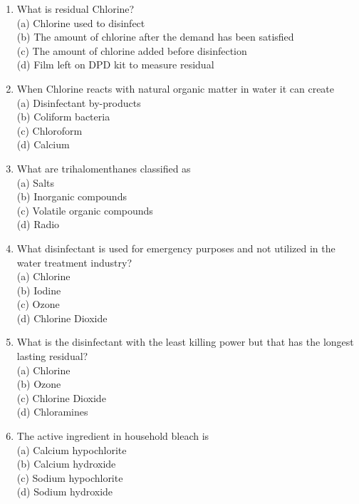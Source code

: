 \documentclass[10pt]{article}
\begin{document}
\begin{enumerate}
\begin{enumerate}
\begin{enumerate}
  \item What is residual Chlorine?\\
(a) Chlorine used to disinfect\\
(b) The amount of chlorine after the demand has been satisfied\\
(c) The amount of chlorine added before disinfection\\
(d) Film left on DPD kit to measure residual\\

  \item When Chlorine reacts with natural organic matter in water it can create\\
(a) Disinfectant by-products\\
(b) Coliform bacteria\\
(c) Chloroform\\
(d) Calcium\\

  \item What are trihalomenthanes classified as\\
(a) Salts\\
(b) Inorganic compounds\\
(c) Volatile organic compounds\\
(d) Radio 

\item What disinfectant is used for emergency purposes and not utilized in the water treatment industry?\\
(a) Chlorine\\
(b) Iodine\\
(c) Ozone\\
(d) Chlorine Dioxide\\

  \item What is the disinfectant with the least killing power but that has the longest lasting residual?\\
(a) Chlorine\\
(b) Ozone\\
(c) Chlorine Dioxide\\
(d) Chloramines\\

  \item The active ingredient in household bleach is\\
(a) Calcium hypochlorite\\
(b) Calcium hydroxide\\
(c) Sodium hypochlorite\\
(d) Sodium hydroxide


\end{enumerate}
\end{enumerate}
\end{enumerate}
\end{document}
